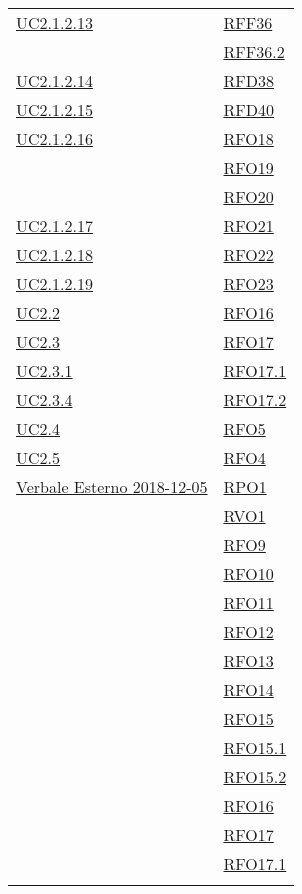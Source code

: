 \begin{longtable}{|>{\centering}m{5cm}|m{5cm}<{\centering}|}
	\hyperref[UC2.1.2.13]{UC2.1.2.13} & \hyperlink{RFF36}{RFF36}\\
	& \hyperlink{RFF36.2}{RFF36.2}\\ \hline
	\hyperref[UC2.1.2.14]{UC2.1.2.14} & \hyperlink{RFD38}{RFD38}\\ \hline
	\hyperref[UC2.1.2.15]{UC2.1.2.15} & \hyperlink{RFD40}{RFD40}\\ \hline
	\hyperref[UC2.1.2.16]{UC2.1.2.16} & \hyperlink{RFO18}{RFO18}\\
	& \hyperlink{RFO19}{RFO19}\\
	& \hyperlink{RFO20}{RFO20}\\ \hline
	\hyperref[UC2.1.2.17]{UC2.1.2.17} & \hyperlink{RFO21}{RFO21}\\ \hline
	\hyperref[UC2.1.2.18]{UC2.1.2.18} & \hyperlink{RFO22}{RFO22}\\ \hline
	\hyperref[UC2.1.2.19]{UC2.1.2.19} & \hyperlink{RFO23}{RFO23}\\ \hline
	\hyperlink{UC2.2}{UC2.2} & \hyperlink{RFO16}{RFO16}\\ \hline
	\hyperlink{UC2.3}{UC2.3} & \hyperlink{RFO17}{RFO17}\\ \hline
	\hyperlink{UC2.3.1}{UC2.3.1} & \hyperlink{RFO17.1}{RFO17.1}\\ \hline
	\hyperlink{UC2.3.4}{UC2.3.4} & \hyperlink{RFO17.2}{RFO17.2}\\ \hline
	\hyperlink{UC2.4}{UC2.4} & \hyperlink{RFO5}{RFO5}\\ \hline
	\hyperlink{UC2.5}{UC2.5} & \hyperlink{RFO4}{RFO4}\\ \hline
	\hyperlink{Verbale Esterno 2018-12-05}{Verbale Esterno 2018-12-05} &
	 \hyperlink{RPO1}{RPO1}\\ & \hyperlink{RVO1}{RVO1}\\ & \hyperlink{RFO9}{RFO9}\\ & \hyperlink{RFO10}{RFO10}\\ & \hyperlink{RFO11}{RFO11}\\ & \hyperlink{RFO12}{RFO12}\\ & \hyperlink{RFO13}{RFO13}\\ & \hyperlink{RFO14}{RFO14}\\ & \hyperlink{RFO15}{RFO15}\\ & \hyperlink{RFO15.1}{RFO15.1}\\ & \hyperlink{RFO15.2}{RFO15.2}\\ & \hyperlink{RFO16}{RFO16}\\ & \hyperlink{RFO17}{RFO17}\\ & \hyperlink{RFO17.1}{RFO17.1}\\ & 

\end{longtable}
